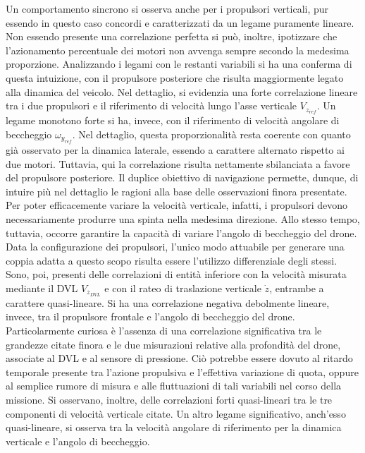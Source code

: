 Un comportamento sincrono si osserva anche per i propulsori verticali, pur essendo in questo caso concordi e caratterizzati da un legame puramente lineare. Non essendo presente una correlazione perfetta si può, inoltre, ipotizzare che l'azionamento percentuale dei motori non avvenga sempre secondo la medesima proporzione. Analizzando i legami con le restanti variabili si ha una conferma di questa intuizione, con il propulsore posteriore che risulta maggiormente legato alla dinamica del veicolo. Nel dettaglio, si evidenzia una forte correlazione lineare tra i due propulsori e il riferimento di velocità lungo l'asse verticale $V_{z_{ref}}$. Un legame monotono forte si ha, invece, con il riferimento di velocità angolare di beccheggio $\omega_{y_{ref}}$. Nel dettaglio, questa proporzionalità resta coerente con quanto già osservato per la dinamica laterale, essendo a carattere alternato rispetto ai due motori. Tuttavia, qui la correlazione risulta nettamente sbilanciata a favore del propulsore posteriore. Il duplice obiettivo di navigazione permette, dunque, di intuire più nel dettaglio le ragioni alla base delle osservazioni finora presentate. Per poter efficacemente variare la velocità verticale, infatti, i propulsori devono necessariamente produrre una spinta nella medesima direzione. Allo stesso tempo, tuttavia, occorre garantire la capacità di variare l'angolo di beccheggio del drone. Data la configurazione dei propulsori, l'unico modo attuabile per generare una coppia adatta a questo scopo risulta essere l'utilizzo differenziale degli stessi. Sono, poi, presenti delle correlazioni di entità inferiore con la velocità misurata mediante il DVL $V_{z_{DVL}}$ e con il rateo di traslazione verticale $\dot{z}$, entrambe a carattere quasi-lineare. Si ha una correlazione negativa debolmente lineare, invece, tra il propulsore frontale e l'angolo di beccheggio del drone. Particolarmente curiosa è l'assenza di una correlazione significativa tra le grandezze citate finora e le due misurazioni relative alla profondità del drone, associate al DVL e al sensore di pressione. Ciò potrebbe essere dovuto al ritardo temporale presente tra l'azione propulsiva e l'effettiva variazione di quota, oppure al semplice rumore di misura e alle fluttuazioni di tali variabili nel corso della missione. Si osservano, inoltre, delle correlazioni forti quasi-lineari tra le tre componenti di velocità verticale citate. Un altro legame significativo, anch'esso quasi-lineare, si osserva tra la velocità angolare di riferimento per la dinamica verticale e l'angolo di beccheggio. 


